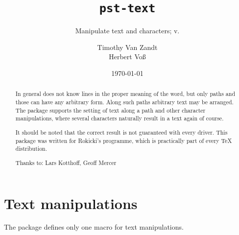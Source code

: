 \documentclass[11pt,english,BCOR10mm,DIV12,bibliography=totoc,parskip=false,smallheadings
    headexclude,footexclude,oneside]{pst-doc}
\let\pstTextFV\fileversion
\begin{document}
\title{\texttt{pst-text}}
\subtitle{Manipulate text and characters; v.\pstTextFV}
\author{Timothy Van Zandt\\Herbert Vo\ss}
\date{\today}
\maketitle

\tableofcontents

\clearpage%

\begin{abstract}
In general \PS does not know lines in the proper meaning of the word, but only
paths and those can have any arbitrary form. Along such paths
arbitrary text may be arranged. The package
 supports the setting of text along a path
and other character manipulations, where several characters 
naturally result in a text again of course.

It should be noted that the correct result is not guaranteed with every  driver.
This package was written for Rokicki's 
 programme, which is practically part of every \TeX{}
distribution.

\vfill
Thanks to: Lars Kotthoff, Geoff Mercer
\end{abstract}

\clearpage

\section{Text manipulations}\label{sec:psttext:Textmanipulationen}
The package  defines only one macro for text manipulations.
\begin{BDef}
\OptArg{}
\end{BDef}
\end{document}
